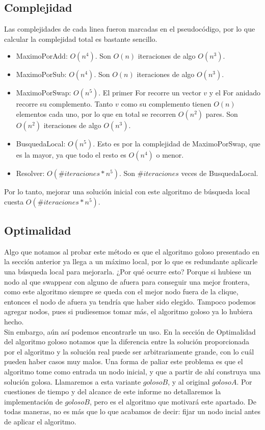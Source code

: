 \subsection{Complejidad}

Las complejidades de cada linea fueron marcadas en el pseudocódigo, por lo que calcular la complejidad total es bastante sencillo.

\begin{itemize}
    \item MaximoPorAdd: $O(n^4)$. Son $O(n)$ iteraciones de algo $O(n^3)$.
    \item MaximoPorSub: $O(n^4)$. Son $O(n)$ iteraciones de algo $O(n^3)$.
    \item MaximoPorSwap: $O(n^5)$. El primer For recorre un vector $v$ y el For anidado recorre su complemento. Tanto $v$ como su complemento tienen $O(n)$ elementos cada uno, por lo que en total se recorren $O(n^2)$ pares. Son $O(n^2)$ iteraciones de algo $O(n^3)$.
    \item BusquedaLocal: $O(n^5)$. Esto es por la complejidad de MaximoPorSwap, que es la mayor, ya que todo el resto es $O(n^4)$ o menor.
    \item Resolver: $O(\#iteraciones * n^5)$. Son $\#iteraciones$ veces de BusquedaLocal.
\end{itemize}

Por lo tanto, mejorar una solución inicial con este algoritmo de búsqueda local cuesta $O(\#iteraciones * n^5)$.

\subsection{Optimalidad}

Algo que notamos al probar este método es que el algoritmo goloso presentado en la sección anterior ya llega a un máximo local, por lo que es redundante aplicarle una búsqueda local para mejorarla. ¿Por qué ocurre esto? Porque si hubiese un nodo al que swappear con alguno de afuera para conseguir una mejor frontera, como este algoritmo siempre se queda con el mejor nodo fuera de la clique, entonces el nodo de afuera ya tendría que haber sido elegido. Tampoco podemos agregar nodos, pues si pudiesemos tomar más, el algoritmo goloso ya lo hubiera hecho.  \\


Sin embargo, aún así podemos encontrarle un uso. En la sección de Optimalidad del algoritmo goloso notamos que la diferencia entre la solución proporcionada por el algoritmo y la solución real puede ser arbitrariamente grande, con lo cuál pueden haber casos muy malos. Una forma de paliar este problema es que el algoritmo tome como entrada un nodo inicial, y que a partir de ahí construya una solución golosa. Llamaremos a esta variante $golosoB$, y al original $golosoA$. Por cuestiones de tiempo y del alcance de este informe no detallaremos la implementación de $golosoB$, pero es el algoritmo que motivará este apartado. De todas maneras, no es más que lo que acabamos de decir: fijar un nodo incial antes de aplicar el algoritmo. \\

